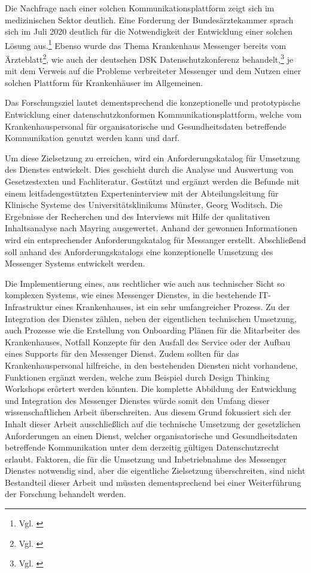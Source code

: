 Die Nachfrage nach einer solchen Kommunikationsplattform zeigt sich im medizinischen Sektor deutlich. Eine Forderung der Bundesärztekammer sprach sich im Juli 2020 deutlich für die Notwendigkeit der Entwicklung einer solchen Lösung aus.\footnote{Vgl. \cite{Bundesaerztekammer2019}} Ebenso wurde das Thema Krankenhaus Messenger bereits vom Ärzteblatt\footnote{Vgl. \cite{Giesselmann2018}}, wie auch der deutschen DSK Datenschutzkonferenz behandelt,\footnote{Vgl. \cite{Datenschutzkonferenz2019}} je mit dem Verweis auf die Probleme verbreiteter Messenger und dem Nutzen einer solchen Plattform für Krankenhäuser im Allgemeinen.

Das Forschungsziel lautet dementsprechend die konzeptionelle und prototypische Entwicklung einer datenschutzkonformen Kommunikationsplattform, welche vom Krankenhauspersonal für organisatorische und Gesundheitsdaten betreffende Kommunikation genutzt werden kann und darf. 

Um diese Zielsetzung zu erreichen, wird ein Anforderungskatalog für Umsetzung des Dienstes entwickelt. Dies geschieht durch die Analyse und Auswertung von Gesetzestexten und Fachliteratur. Gestützt und ergänzt werden die Befunde mit einem leitfadengestützten Experteninterview mit der Abteilungsleitung für Klinische Systeme des Universitätsklinikums Münster, Georg Woditsch. Die Ergebnisse der Recherchen und des Interviews mit Hilfe der qualitativen Inhaltsanalyse nach Mayring ausgewertet. Anhand der gewonnen Informationen wird ein entsprechender Anforderungskatalog für Messanger erstellt. Abschließend soll anhand des Anforderungskatalogs eine konzeptionelle Umsetzung des Messenger Systems entwickelt werden.

Die Implementierung eines, aus rechtlicher wie auch aus technischer Sicht so komplexen Systems, wie eines Messenger Dienstes, in die bestehende IT-Infrastruktur eines Krankenhauses, ist ein sehr umfangreicher Prozess. Zu der Integration des Dienstes zählen, neben der eigentlichen technischen Umsetzung, auch Prozesse wie die Erstellung von Onboarding Plänen für die Mitarbeiter des Krankenhauses, Notfall Konzepte für den Ausfall des Service oder der Aufbau eines Supports für den Messenger Dienst. Zudem sollten für das Krankenhauspersonal hilfreiche, in den bestehenden Diensten nicht vorhandene, Funktionen ergänzt werden, welche zum Beispiel durch Design Thinking Workshops erörtert werden könnten. Die komplette Abbildung der Entwicklung und Integration des Messenger Dienstes würde somit den Umfang dieser wissenschaftlichen Arbeit überschreiten. Aus diesem Grund fokussiert sich der Inhalt dieser Arbeit ausschließlich auf die technische Umsetzung der gesetzlichen Anforderungen an einen Dienst, welcher organisatorische und Gesundheitsdaten betreffende Kommunikation unter dem derzeitig gültigen Datenschutzrecht erlaubt. Faktoren, die für die Umsetzung und Inbetriebnahme des Messenger Dienstes notwendig sind, aber die eigentliche Zielsetzung überschreiten, sind nicht Bestandteil dieser Arbeit und müssten dementsprechend bei einer Weiterführung der Forschung behandelt werden.

